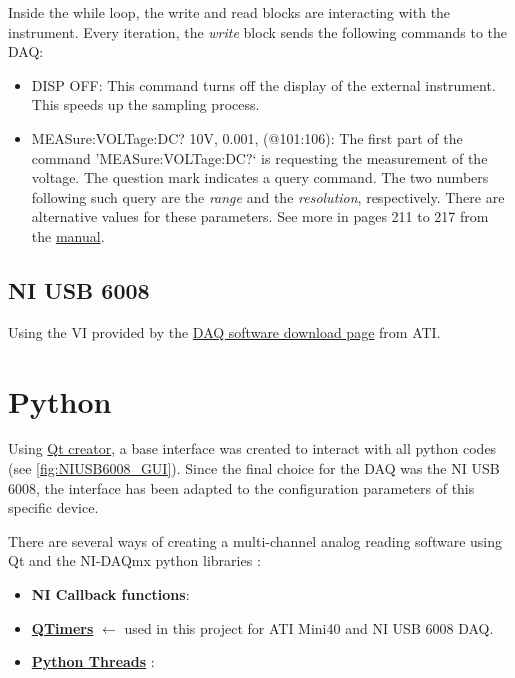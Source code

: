 \documentclass[a4paper]{article}
\begin{document}
Inside the while loop, the write and read blocks are interacting with the instrument. Every iteration, the \textit{write} block sends the following commands to the DAQ:

\begin{itemize}
	\item DISP OFF: This command turns off the display of the external instrument. This speeds up the sampling process.
	\item MEASure:VOLTage:DC? 10V, 0.001, (@101:106): The first part of the command 'MEASure:VOLTage:DC$?$` is requesting the measurement of the voltage. The question mark indicates a query command. The two numbers following such query are the \textit{range} and the \textit{resolution}, respectively. There are alternative values for these parameters. See more in pages 211 to 217 from the \hyperref{https://www.manualsbase.com/manual/439362/switch/hp_(hewlett-packard)/hp_34970a/}{category}{name}{manual}.
\end{itemize}

\subsection{NI USB 6008}

Using the VI provided by the \hyperref{https://www.ati-ia.com/products/ft/software/daq_software.aspx}{category}{name}{DAQ software download page} from ATI.


\section{Python}

Using \hyperref{https://www.qt.io/product/development-tools}{category}{name}{Qt creator}, a base interface was created to interact with all python codes (see \autoref{fig:NIUSB6008_GUI}). Since the final choice for the DAQ was the NI USB 6008, the interface has been adapted to the configuration parameters of this specific device.

There are several ways of creating a multi-channel analog reading software using Qt and the NI-DAQmx python libraries \cite{goncalo}:

\begin{itemize}
	\item \textbf{NI Callback functions}: 
	\item \textbf{\hyperref{https://doc.qt.io/qt-6/qtimer.html}{category}{name}{QTimers}} $\leftarrow$ used in this project for ATI Mini40 and NI USB 6008 DAQ.
	\item \textbf{\hyperref{https://realpython.com/intro-to-python-threading/}{category}{name}{Python Threads}} :
\end{itemize}
\end{document}
